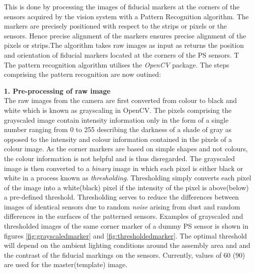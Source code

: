 \documentclass[fleqn,10pt]{SelfArx} %
\begin{document}
This is done by processing the images of fiducial markers at the corners of the sensors acquired by the vision system with a Pattern Recognition algorithm. The markers are precisely positioned with respect to the strips or pixels or the sensors. Hence precise alignment of the markers ensures precise alignment of the pixels or strips.The algorithm takes raw images as input as returns the position and orientation of fiducial markers located at the corners of the PS sensors. T The pattern recognition algorithm utilises the \emph{OpenCV} package. The steps comprising the pattern recognition are now outined:

\textbf{1. Pre-processing of raw image}\\
The raw images from the camera are first converted from colour to black and white which is known as grayscaling in OpenCV. The pixels comprising the grayscaled image contain intensity information only in the form of a single number ranging from 0 to 255 describing the darkness of a shade of gray as opposed to the intensity and colour information contained in the pixels of a colour image. As the corner markers are based on simple shapes and not colours, the colour information is not helpful and is thus disregarded. The grayscaled image is then converted to a \emph{binary} image in which each pixel is either black or white in a process known as \emph{thresholding}. Thresholding simply converts each pixel of the image into a white(black) pixel if the intensity of the pixel is above(below) a pre-defined threshold. Thresholding serves to reduce the differences between images of identical sensors due to random \emph{noise} arising from dust and random differences in the surfaces of the patterned sensors. Examples of grayscaled and thresholded images of the same corner marker of a dummy PS sensor is shown in figures \ref{fig:grayscaledmarker} and \ref{fig:thresholdedmarker}. The optimal threshold will depend on the ambient lighting conditions around the assembly area and and the contrast of the fiducial markings on the sensors. Currently, values of 60 (90) are used for the master(template) image.



\end{document}
